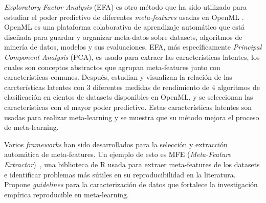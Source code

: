 \textit{Exploratory Factor Analysis} (EFA) es otro método que ha sido utilizado para estudiar el poder predictivo de diferentes \textit{meta-features} usadas en OpenML \cite{bilalli2017predictive}. OpenML es una plataforma colaborativa de aprendizaje automático que está diseñada para guardar y organizar meta-datos sobre datasets, algoritmos de minería de datos, modelos y sus evaluaciones. EFA, más específicamente \textit{Principal Component Analysis} (PCA),  es usado para extraer las características latentes, los cuales son conceptos abstractos que agrupan meta-features junto con características comunes. Después, estudian y visualizan la relación de las carcterísticas latentes con 3 diferentes medidas de rendimiento de 4 algoritmos de clasificación en cientos de datasets disponibles en OpenML, y se seleccionan las características con el mayor poder predictivo. Estas características latentes son usadas para realizar meta-learning y se muestra que su método mejora el proceso de meta-learning.

Varios \textit{frameworks} han sido desarrollados para la selección y extracción automática de meta-features. Un ejemplo de esto es MFE (\textit{Meta-Feature Extractor})~\cite{Rivolli2018TowardsRE}, una biblioteca de R usada para extraer meta-features de los datasets e identificar problemas más sútiles en su reproducibilidad en la literatura. Propone \textit{guidelines} para la caracterización de datos que fortalece la investigación empírica reproducible en meta-learning.


%

